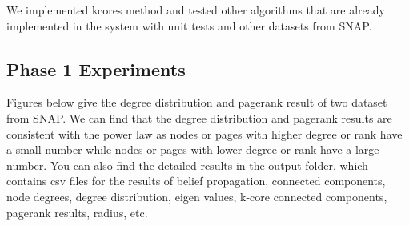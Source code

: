 
We implemented kcores method
and tested other algorithms that are already implemented in the system with unit tests and other datasets from SNAP.

\subsection{Phase 1 Experiments}

Figures below give the degree distribution and pagerank result of two dataset from SNAP. We can find that the degree distribution and pagerank results are consistent with the power law as nodes or pages with higher degree or rank have a small number while nodes or pages with lower degree or rank have a large number.
You can also find the detailed results in the output folder, which contains csv files for the results of belief propagation, connected components, node degrees, degree distribution, eigen values, k-core connected components, pagerank results, radius, etc. 


